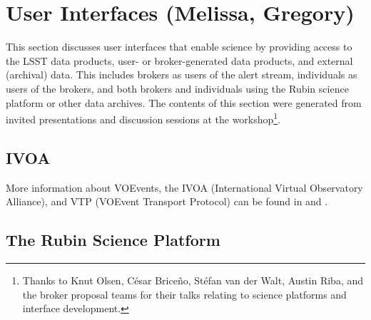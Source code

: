\section{User Interfaces (Melissa, Gregory)} \label{sec:interfaces}



This section discusses user interfaces that enable science by providing access to the LSST data products, user- or broker-generated data products, and external (archival) data.
This includes brokers as users of the alert stream, individuals as users of the brokers, and both brokers and individuals using the Rubin science platform or other data archives.
The contents of this section were generated from invited presentations and discussion sessions at the workshop\footnote{Thanks to Knut Olsen, César Briceño, Stéfan van der Walt, Austin Riba, and the broker proposal teams for their talks relating to science platforms and interface development.}.

\subsection{IVOA}\label{ssec:interfaces_ivoa}


More information about VOEvents, the  {IVOA} (International Virtual Observatory Alliance), and  {VTP} (VOEvent Transport Protocol) can be found in \citet{2011ivoa.spec.0711S} and \citet{2017arXiv170901264A}.


\subsection{The Rubin  {Science Platform}}\label{ssec:interfaces_rsp}

